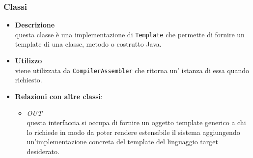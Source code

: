 \subsubsection{Classi}
\label{\nogloxy{swedesigner::server::template::java::JavaTemplate}}
\begin{itemize}
\item \textbf{Descrizione}\\
questa classe è una implementazione di \texttt{Template} che permette di fornire un template di una classe, metodo o costrutto Java.
\item \textbf{Utilizzo}\\
viene utilizzata da \texttt{CompilerAssembler} che ritorna un' istanza di essa quando richiesto.
\item \textbf{Relazioni con altre classi}:
\begin{itemize}
\item \textit{OUT} \hyperref[\nogloxy{swedesigner::server::template::Template}]{}\\
questa interfaccia si occupa di fornire un oggetto template generico a chi lo richiede in modo da poter rendere estensibile il sistema aggiungendo un'implementazione concreta del template del linguaggio target desiderato.
\end{itemize}
\end{itemize}
\subsection{}
\label{\nogloxy{swedesigner::server::utility}}
